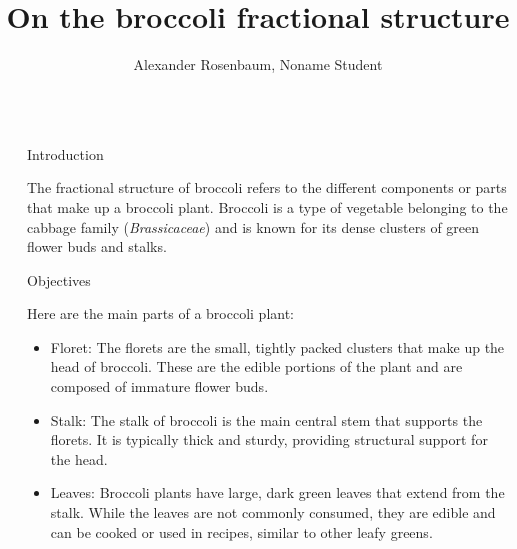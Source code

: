 \documentclass{beamer}
\title{On the broccoli fractional structure}
\author{Alexander Rosenbaum, Noname Student}
\begin{document}
\nocite{*} %

\begin{frame}[t]
    \begin{columns}[t] %
     
    \begin{column}{\lrmargin}\end{column} %
    
    \begin{column}{\onecolwid} %
     
    
    \begin{block}{Introduction}
    
    The fractional structure of broccoli refers to the different components or parts that make up a broccoli plant. Broccoli is a type of vegetable belonging to the cabbage family (\textit{Brassicaceae}) and is known for its dense clusters of green flower buds and stalks. 
    
    \end{block}
    
    
    \begin{alertblock}{Objectives}
    
    Here are the main parts of a broccoli plant:
    \begin{itemize}
        \item Floret: The florets are the small, tightly packed clusters that make up the head of broccoli. These are the edible portions of the plant and are composed of immature flower buds.

    	\item  Stalk: The stalk of broccoli is the main central stem that supports the florets. It is typically thick and sturdy, providing structural support for the head.

    	\item Leaves: Broccoli plants have large, dark green leaves that extend from the stalk. While the leaves are not commonly consumed, they are edible and can be cooked or used in recipes, similar to other leafy greens.


\end{itemize}
\end{alertblock}
\end{column}
\end{columns}
\end{frame}
\end{document}
